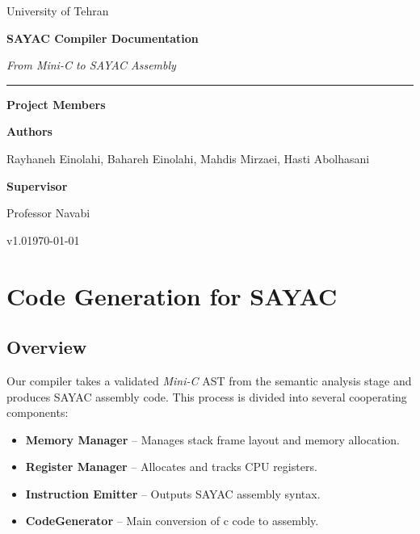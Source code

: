 \documentclass[12pt,a4paper]{report}
\newcommand{\OrgName}{University of Tehran}
\newcommand{\DocTitle}{SAYAC Compiler Documentation}
\newcommand{\DocSubtitle}{From Mini-C to SAYAC Assembly}
\newcommand{\Authors}{Rayhaneh Einolahi, Bahareh Einolahi, Mahdis Mirzaei, Hasti Abolhasani}
\newcommand{\Supervisor}{Professor Navabi}
\newcommand{\VersionTag}{v1.0}
\newcommand{\ReleaseDate}{\today}
\begin{document}
\begin{titlepage}
  \centering
  {\Large \OrgName\par}
  \vspace{1.6cm}
  {\Huge\bfseries \DocTitle\par}
  \vspace{0.35cm}
  {\Large\itshape \DocSubtitle\par}
  \vspace{1.2cm}
  \rule{\textwidth}{1pt}\par
  \vspace{0.6cm}
  {\large
    \textbf{Project Members}\par
    \vspace{0.2cm}
    \textbf{Authors}\par
    \vspace{0.2cm}
    \Authors\par
    \textbf{Supervisor}\par
    \vspace{0.2cm}
    \Supervisor\par
  }
  \vfill
  {\small \VersionTag\quad\textbullet\quad \ReleaseDate\par}
\end{titlepage}

\tableofcontents
\clearpage

\chapter*{Code Generation for SAYAC}
\setcounter{section}{0}
\label{chap:codegen}

\section{Overview}
Our compiler takes a validated \emph{Mini-C} AST from the semantic analysis stage and produces SAYAC assembly code.
This process is divided into several cooperating components:
\begin{itemize}
    \item \textbf{Memory Manager} -- Manages stack frame layout and memory allocation.
    \item \textbf{Register Manager} -- Allocates and tracks CPU registers.
    \item \textbf{Instruction Emitter} -- Outputs SAYAC assembly syntax.
    \item \textbf{CodeGenerator} -- Main conversion of c code to assembly.

  \end{itemize}
\end{document}
